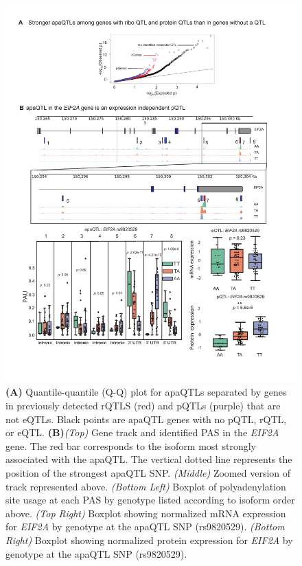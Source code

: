\begin{figure}
\centering
\includegraphics[width=5in]{img/ch02/figure4.pdf}
\caption[apaQTLs explain expression independent rQTLs and pQTLs] {\small {\bf (A)} Quantile-quantile (Q-Q) plot for apaQTLs separated by genes in previously detected rQTLS (red) and pQTLs (purple) that are not eQTLs. Black points are apaQTL genes with no pQTL, rQTL, or eQTL. {\bf (B)}{\it (Top)} Gene track and identified PAS in the {\it EIF2A} gene. The red bar corresponds to the isoform most strongly associated with the apaQTL. The vertical dotted line represents the position of the strongest apaQTL SNP. {\it (Middle)} Zoomed version of track represented above. {\it (Bottom Left)} Boxplot of polyadenylation site usage at each PAS by genotype listed according to isoform order above.  {\it (Top Right)} Boxplot showing normalized mRNA expression for {\it EIF2A} by genotype at the apaQTL SNP (rs9820529).   {\it (Bottom Right)} Boxplot showing normalized protein expression for {\it EIF2A} by genotype at the apaQTL SNP (rs9820529).}
\label{fig:expInd}
\end{figure}


